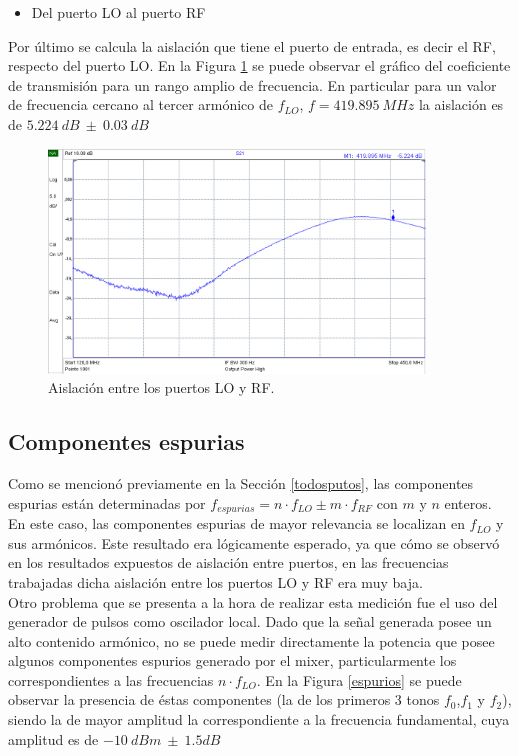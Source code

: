 \documentclass[a4paper,10pt]{article}
\begin{document}
	\begin{itemize}
		\item Del puerto LO al puerto RF
	\end{itemize}
	
	\indent Por \'ultimo se calcula la aislaci\'on que tiene el puerto de 
	entrada, es decir el RF, respecto del puerto LO. En la Figura 
	\ref{isolation3} se puede observar el gr\'afico del coeficiente de 
	transmisi\'on para un rango amplio de frecuencia. En particular para un 
	valor de frecuencia cercano al tercer arm\'onico de 
	$f_{LO}$, $f=419.895~MHz$ la aislaci\'on es de $5.224~dB~\pm~0.03~dB$
	
	\begin{figure}[!htb]
		\centering
		\includegraphics[width=10cm]{Images/aislacion3.png}
		\caption{Aislaci\'on entre los puertos LO y RF.}
		\label{isolation3}
	\end{figure}	
	
	\subsection{Componentes espurias}
	\indent Como se mencion\'o previamente en la Secci\'on \ref{todosputos}, las
	componentes espurias est\'an determinadas por 
	$f_{espurias}=n\cdot f_{LO}\pm m\cdot f_{RF}$ con $m$ y $n$ enteros. En este
	caso, las componentes espurias de mayor relevancia se localizan en $f_{LO}$ 
	y sus arm\'onicos. Este resultado era l\'ogicamente esperado, ya que c\'omo 
	se observ\'o en los resultados expuestos de aislaci\'on entre puertos, en 
	las frecuencias trabajadas dicha aislaci\'on entre los puertos LO y RF era 
	muy baja. \\
	\indent Otro problema que se presenta a la hora de realizar esta medición 
	fue el uso del generador de pulsos como oscilador local. Dado que la señal
	generada posee un alto contenido armónico, no se puede medir directamente la
	potencia que posee algunos componentes espurios generado por el mixer, 
	particularmente los correspondientes a las frecuencias $n\cdot f_{LO}$.
	\indent En la Figura \ref{espurios} se puede observar la presencia de 
	\'estas componentes (la de los primeros 3 tonos $f_0$,$f_1$ y $f_2$), siendo
	la de mayor amplitud la correspondiente a la frecuencia fundamental, cuya 
	amplitud es de $-10~dBm~\pm~1.5dB$
	
\end{document}
